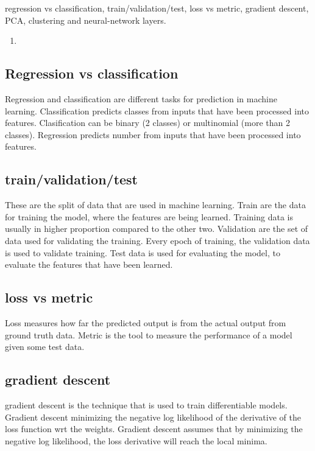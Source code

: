 



regression vs classification, train/validation/test, loss vs metric, gradient descent, PCA, clustering and neural-network layers. 


\begin{enumerate}
    \item 
\end{enumerate}

\subsection{Regression vs classification}

Regression and classification are different tasks for prediction in machine learning. Classification predicts classes from inputs that have been processed into features. Clasification can be binary (2 classes) or multinomial (more than 2 classes). Regression predicts number from inputs that have been processed into features. 

\subsection{train/validation/test}
These are the split of data that are used in machine learning. Train are the data for training the model, where the features are being learned. Training data is usually in higher proportion compared to the other two. Validation are the set of data used for validating the training. Every epoch of training, the validation data is used to validate training. Test data is used for evaluating the model, to evaluate the features that have been learned. 

\subsection{loss vs metric}
Loss measures how far the predicted output is from the actual output from ground truth data. Metric is the tool to measure the performance of a model given some test data.  

\subsection{gradient descent}
gradient descent is the technique that is used to train differentiable models. Gradient descent minimizing the negative log likelihood of the derivative of the loss function wrt the weights. Gradient descent assumes that by minimizing the negative log likelihood, the loss derivative will reach the local minima. 
